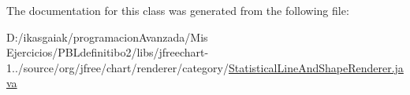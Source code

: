 The documentation for this class was generated from the following file\+:\begin{DoxyCompactItemize}
\item 
D\+:/ikasgaiak/programacion\+Avanzada/\+Mis Ejercicios/\+P\+B\+Ldefinitibo2/libs/jfreechart-\/1../source/org/jfree/chart/renderer/category/\mbox{\hyperlink{_statistical_line_and_shape_renderer_8java}{Statistical\+Line\+And\+Shape\+Renderer.\+java}}\end{DoxyCompactItemize}
